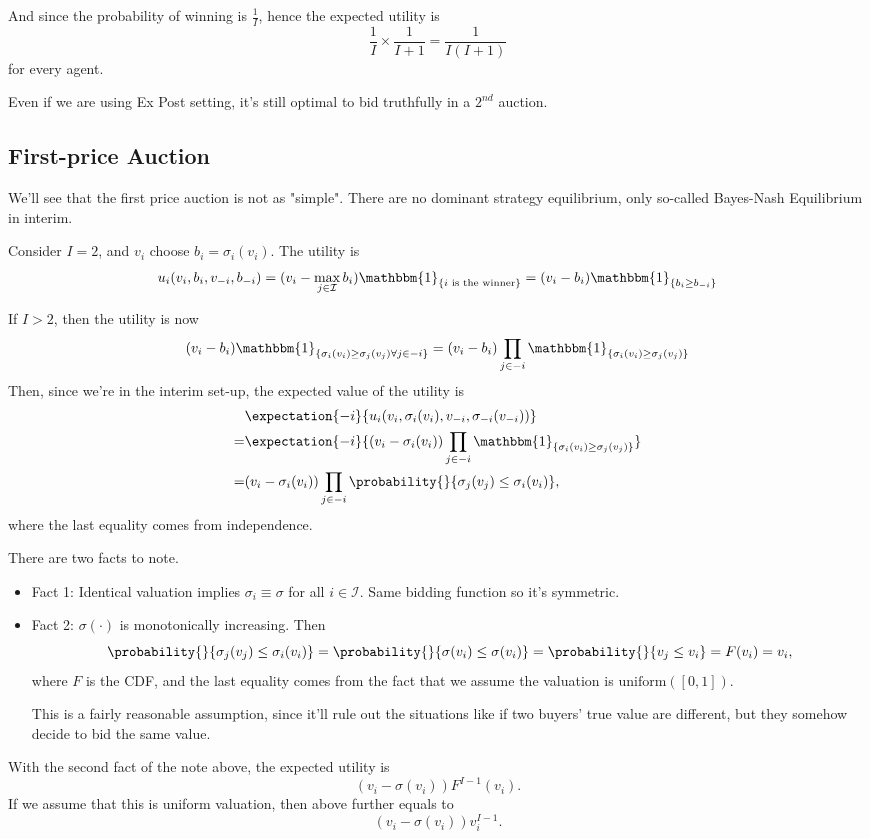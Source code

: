 And since the probability of winning is \(\frac{1}{I}\), hence the expected utility is
\[
	\frac{1}{I}\times \frac{1}{I+1} = \frac{1}{I(I + 1)}
\]
for every agent.

\begin{note}
	Even if we are using Ex Post setting, it's still optimal to bid truthfully in a \(2^{nd}\) auction.
\end{note}

\subsection{First-price Auction}
We'll see that the first price auction is not as "simple". There are no dominant strategy equilibrium, only so-called
Bayes-Nash Equilibrium in interim.

\hr

Consider \(I = 2\), and \(v_{i}\) choose \(b_{i} = \sigma_{i}(v_{i})\). The utility is
\[
	u_{i}(v_{i}, b_{i}, v_{-i}, b_{-i}) = (v_{i} - \max_{j\in \mathcal{I} }b_{i})\mathbbm{1}_{\{ i \text{ is the winner} \}} = (v_{i} - b_{i})\mathbbm{1}_{\{ b_{i}\geq b_{-i} \}}
\]

If \(I>2\), then the utility is now
\[
	(v_{i} - b_{i})\mathbbm{1}_{\{ \sigma_{i}(v_{i})\geq \sigma_{j}(v_{j})\forall j\in -i \}} = (v_{i} - b_{i})\prod\limits_{j\in -i} \mathbbm{1}_{\{ \sigma_{i}(v_{i})\geq \sigma_{j}(v_{j}) \}}
\]
Then, since we're in the interim set-up, the expected value of the utility is
\[
	\begin{split}
		&\expectation{-i}{u_{i}(v_{i}, \sigma_{i}(v_{i}), v_{-i}, \sigma_{-i}(v_{-i}))} \\
		= &\expectation{-i}{(v_{i} - \sigma_{i}(v_{i})) \prod\limits_{j\in -i}\mathbbm{1}_{\{ \sigma_{i}(v_{i})\geq \sigma_{j}(v_{j}) \}}}\\
		= &(v_{i} - \sigma_{i}(v_{i}))\prod\limits_{j\in -i}\probability{}{\sigma_{j}(v_{j})\leq \sigma_{i}(v_{i})},
	\end{split}
\]
where the last equality comes from independence.

\begin{note}
	There are two facts to note.
	\begin{itemize}
		\item Fact 1: Identical valuation implies \(\sigma_{i} \equiv \sigma\) for all \(i\in \mathcal{I} \). Same bidding function so it's symmetric.
		\item Fact 2: \(\sigma(\cdot)\) is monotonically increasing. Then
		      \[
			      \probability{}{\sigma_{j}(v_{j})\leq \sigma_{i}(v_{i})} = \probability{}{\sigma(v_{i})\leq \sigma(v_{i})} = \probability{}{v_{j}\leq v_{i}} = F(v_{i}) = v_{i},
		      \]
		      where \(F\) is the CDF, and the last equality comes from the fact that we assume the valuation is \(\mathrm{uniform}([0, 1])\).

		      This is a fairly reasonable assumption, since it'll rule out the situations like if two buyers' true value are different, but they somehow decide to bid
		      the same value.
	\end{itemize}
\end{note}

With the second fact of the note above, the expected utility is
\[
	(v_{i} - \sigma(v_{i})) F^{I-1}(v_{i}).
\]
If we assume that this is uniform valuation, then above further equals to
\[
	(v_{i} - \sigma(v_{i}))v^{I-1}_{i}.
\]